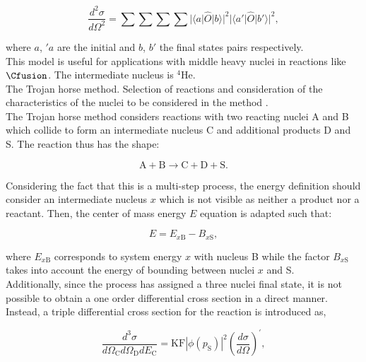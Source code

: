 \documentclass[openany]{book}
\begin{document}
\begin{equation}\label{eq: special_differential_double}
	\frac{d^2\sigma}{d\Omega^2} = \sum \sum \sum \sum  |\langle a | \hat O | b \rangle|^2 |\langle a' | \hat O | b' \rangle|^2,
\end{equation}

where $a$, $'a$ are the initial and $b$, $b'$ the final states pairs respectively. \\

This model is useful for applications with middle heavy nuclei in reactions like $\Cfusion$. The intermediate nucleus is $\mathrm{{}^{4}He}$. \\

The Trojan horse method. Selection of reactions and consideration of the characteristics of the nuclei to be considered in the method \cite{spitaleri_mukhamedzhanov_blokhintsev_cognata_pizzone_tumino_2011}. \\

The Trojan horse method considers reactions with two reacting nuclei A and B which collide to form an intermediate nucleus C and additional products D and S. The reaction thus has the shape:

\begin{equation}\label{eq:special_THM_reaction}
	\mathrm{A + B \rightarrow C + D + S}.
\end{equation}

Considering the fact that this is a multi-step process, the energy definition should consider an intermediate nucleus $x$ which is not visible as neither a product nor a reactant. Then, the center of mass energy $E$ equation is adapted such that: 

\begin{equation}\label{eq:special_THM_energy}
	E = E_{x\mathrm{B}} - B_{x\mathrm{S}},
\end{equation}

where $E_{x\mathrm{B}}$ corresponds to system energy $x$ with nucleus B while the factor $B_{x\mathrm{S}}$ takes into account the energy of bounding between nuclei $x$ and S.  \\

Additionally, since the process has assigned a three nuclei final state, it is not possible to obtain a one order differential cross section in a direct manner. Instead, a triple differential cross section for the reaction is introduced as, 

\begin{equation}\label{eq:special_THM_triple differential}
	\frac{d^3\sigma }{d\Omega_{\mathrm{C}} d\Omega_{\mathrm{D}} dE_\mathrm{C}} = \mathrm{KF} |\phi(p_\mathrm{S})|^2 \left(  \frac{d\sigma}{d\Omega}\right)^{'},
\end{equation}
\end{document}
